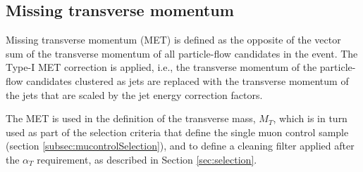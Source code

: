 
\subsection{Missing transverse momentum}
Missing transverse momentum (MET) is defined as the opposite of the vector sum
of the transverse momentum of all particle-flow candidates in the event.
The Type-I MET correction \cite{met-corrections} is applied, i.e., the transverse momentum of
the particle-flow candidates clustered as jets are replaced with the
transverse momentum of the jets that are scaled by the jet energy
correction factors.

The MET is used in the definition of 
the transverse mass, $M_{T}$, which is in turn used as part of
the selection criteria that define the single muon control sample 
(section \ref{subsec:mucontrolSelection}), and to define a cleaning filter applied after the
$\alpha_{T}$ requirement, as described in Section \ref{sec:selection}.




